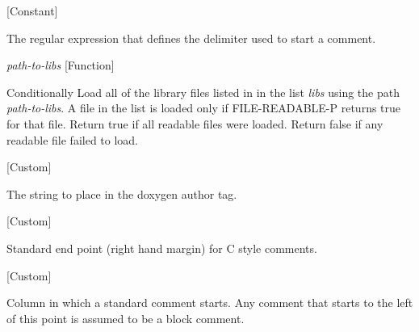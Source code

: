 \vspace{1em}
\noindent
{}
\usebox{\funcname}
 \hfill [Constant]

\begin{doc-string}
The regular expression that defines the delimiter used to start
a comment.
\end{doc-string}

\vspace{1em}
\noindent
{}
\usebox{\funcname}\emph{path-to-libs}
 \hfill [Function]
\hspace*{\wd\funcname}

\begin{doc-string}
Conditionally Load all of the library files listed in in the list \emph{libs} using
the path \emph{path-to-libs}.  A file in the list is loaded only if FILE-READABLE-P
returns true for that file.  Return true if all readable files were loaded.
Return false if any readable file failed to load.
\end{doc-string}

\vspace{1em}
\noindent
{}
\usebox{\funcname}
 \hfill [Custom]

\begin{doc-string}
The string to place in the doxygen author tag.
\end{doc-string}

\vspace{1em}
\noindent
{}
\usebox{\funcname}
 \hfill [Custom]

\begin{doc-string}
Standard end point (right hand margin) for C style comments.
\end{doc-string}

\vspace{1em}
\noindent
{}
\usebox{\funcname}
 \hfill [Custom]

\begin{doc-string}
Column in which a standard comment starts.  Any comment that starts to the left of
this point is assumed to be a block comment.
\end{doc-string}

